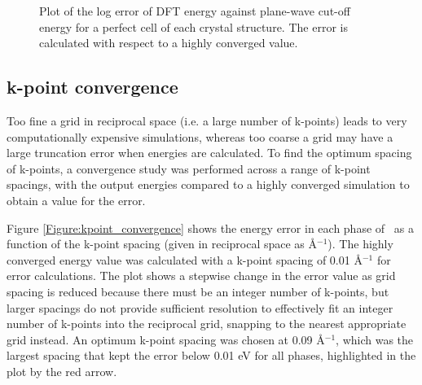 \begin{figure}
	\begin{center}
		\caption{Plot of the log error of DFT energy against plane-wave cut-off energy for a perfect cell of each crystal structure. The error is calculated with respect to a highly converged value.}
		\label{Figure:cutoffconvergence}
	\end{center}
\end{figure}

\subsection{k-point convergence}

Too fine a grid in reciprocal space (i.e. a large number of k-points) leads to very computationally expensive simulations, whereas too coarse a grid may have a large truncation error when energies are calculated. To find the optimum spacing of k-points, a convergence study was performed across a range of k-point spacings, with the output energies compared to a highly converged simulation to obtain a value for the error. 

Figure \ref{Figure:kpoint_convergence} shows the energy error in each phase of \zirconia\ as a function of the k-point spacing (given in reciprocal space as \r{A}$^{-1}$). The highly converged energy value was calculated with a k-point spacing of 0.01 \r{A}$^{-1}$ for error calculations. The plot shows a stepwise change in the error value as grid spacing is reduced because there must be an integer number of k-points, but larger spacings do not provide sufficient resolution to effectively fit an integer number of k-points into the reciprocal grid, snapping to the nearest appropriate grid instead. An optimum k-point spacing was chosen at 0.09 \r{A}$^{-1}$, which was the largest spacing that kept the error below 0.01 eV for all phases, highlighted in the plot by the red arrow.

